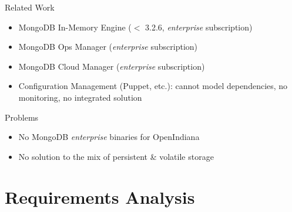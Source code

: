 \documentclass[11pt,aspectratio=169]{beamer}
\begin{document}
    \begin{frame}{Related Work}
        
        \begin{itemize}
            \item MongoDB In-Memory Engine ($<$ 3.2.6, \textit{enterprise} subscription)
            \item MongoDB Ops Manager (\textit{enterprise} subscription)
            \item MongoDB Cloud Manager (\textit{enterprise} subscription)
            \item Configuration Management (Puppet, etc.): cannot model dependencies, no monitoring, no integrated solution
        \end{itemize}
        
        Problems
        
        \begin{itemize}
            \item No MongoDB \textit{enterprise} binaries for OpenIndiana
            \item No solution to the mix of persistent \& volatile storage 
        \end{itemize}
        
    \end{frame}
    
    
    \section{Requirements Analysis}
   
\end{document}
